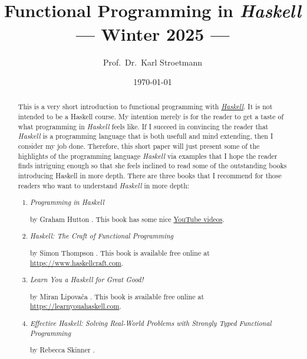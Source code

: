 \documentclass[11pt]{report}
\title{\epsfig{file=dhbw-logo.pdf, scale=1.5}\\[0.3cm]  
       Functional Programming in \textsl{Haskell} \\[0.3cm]
      --- Winter 2025 ---}
\author{Prof.~Dr.~Karl Stroetmann}
\date{\today \\[1.5cm]
  \dangersign \wip \dangersign
}
\begin{document}
\maketitle
\tableofcontents

\begin{abstract}
\noindent
This is a very short introduction to functional programming with
\href{https://en.wikipedia.org/wiki/Haskell}{\textsl{Haskell}}. 
It is not intended to be a Haskell course.  My intention merely is for the reader to get a taste of what
programming in \textsl{Haskell} feels like.  If I succeed in convincing the reader that \textsl{Haskell} is a
programming language that is both usefull and mind extending, then I consider my job done.
Therefore, this short paper will just present some of the highlights of the programming language
\textsl{Haskell} via examples that I hope the reader finds intriguing enough so that she feels inclined to read
some of the outstanding books introducing Haskell in more depth.  There are three books that I recommend for
those readers who want to understand \textsl{Haskell} in more depth:  
\begin{enumerate}
\item \emph{Programming in Haskell}

      by Graham Hutton \cite{hutton:2016}.  This book has some nice \href{https://www.youtube.com/playlist?list=PLF1Z-APd9zK7usPMx3LGMZEHrECUGodd3}{YouTube videos}.
\item \emph{Haskell: The Craft of Functional Programming}

      by Simon Thompson \cite{thompson:2011}.
      This book is available free online at
      \\[0.2cm]
      \hspace*{1.3cm}
      \href{https://www.haskellcraft.com}{https://www.haskellcraft.com}.

\item \emph{Learn You a Haskell for Great Good!}

      by Miran Lipova\v{c}a \cite{lipovaca:2011}.
      This book is available free online at
      \\[0.2cm]
      \hspace*{1.3cm}
      \href{https://learnyouahaskell.com/}{https://learnyouahaskell.com}.
\item \emph{Effective Haskell: Solving Real-World Problems with Strongly Typed Functional Programming} 

      by Rebecca Skinner \cite{skinner:2023}.
\end{enumerate}
\end{abstract}







\end{document}
